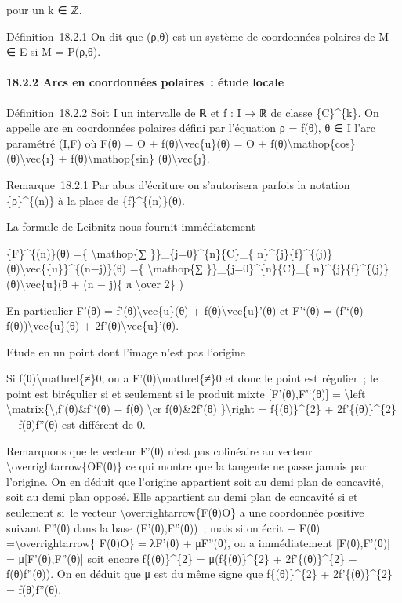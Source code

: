 \documentclass[]{article}
\begin{document}
pour un k ∈ ℤ.

Définition~18.2.1 On dit que (ρ,θ) est un système de coordonnées
polaires de M ∈ E si M = P(ρ,θ).

\paragraph{18.2.2 Arcs en coordonnées polaires~: étude locale}

Définition~18.2.2 Soit I un intervalle de ℝ et f : I → ℝ de classe
\{C\}\^{}\{k\}. On appelle arc en coordonnées polaires défini par
l'équation ρ = f(θ), θ ∈ I l'arc paramétré (I,F) où F(θ) = O +
f(θ)\textbackslash{}vec\{u\}(θ) = O + f(θ)\textbackslash{}mathop\{cos\}
(θ)\textbackslash{}vec\{ı\} + f(θ)\textbackslash{}mathop\{sin\}
(θ)\textbackslash{}vec\{ȷ\}.

Remarque~18.2.1 Par abus d'écriture on s'autorisera parfois la notation
\{ρ\}\^{}\{(n)\} à la place de \{f\}\^{}\{(n)\}(θ).

La formule de Leibnitz nous fournit immédiatement

\{F\}\^{}\{(n)\}(θ) =\{ \textbackslash{}mathop\{∑
\}\}\_\{j=0\}\^{}\{n\}\{C\}\_\{
n\}\^{}\{j\}\{f\}\^{}\{(j)\}(θ)\textbackslash{}vec\{\{u\}\}\^{}\{(n−j)\}(θ)
=\{ \textbackslash{}mathop\{∑ \}\}\_\{j=0\}\^{}\{n\}\{C\}\_\{
n\}\^{}\{j\}\{f\}\^{}\{(j)\}(θ)\textbackslash{}vec\{u\}(θ + (n − j)\{ π
\textbackslash{}over 2\} )

En particulier F'(θ) = f'(θ)\textbackslash{}vec\{u\}(θ) +
f(θ)\textbackslash{}vec\{u\}'(θ) et F'`(θ) = (f'`(θ) −
f(θ))\textbackslash{}vec\{u\}(θ) + 2f'(θ)\textbackslash{}vec\{u\}'(θ).

Etude en un point dont l'image n'est pas l'origine

Si f(θ)\textbackslash{}mathrel\{≠\}0, on a
F'(θ)\textbackslash{}mathrel\{≠\}0 et donc le point est régulier~; le
point est birégulier si et seulement si le produit mixte
{[}F'(θ),F'`(θ){]} = \textbackslash{}left
\textbar{}\textbackslash{}matrix\{\textbackslash{},f'(θ)\&f'`(θ) − f(θ)
\textbackslash{}cr f(θ)\&2f'(θ) \}\textbackslash{}right \textbar{} =
f\{(θ)\}\^{}\{2\} + 2f'\{(θ)\}\^{}\{2\} − f(θ)f''(θ) est différent de 0.

Remarquons que le vecteur F'(θ) n'est pas colinéaire au vecteur
\textbackslash{}overrightarrow\{OF(θ)\} ce qui montre que la tangente ne
passe jamais par l'origine. On en déduit que l'origine appartient soit
au demi plan de concavité, soit au demi plan opposé. Elle appartient au
demi plan de concavité si et seulement si~le vecteur
\textbackslash{}overrightarrow\{F(θ)O\} a une coordonnée positive
suivant F''(θ) dans la base (F'(θ),F''(θ))~; mais si on écrit − F(θ)
=\textbackslash{}overrightarrow\{ F(θ)O\} = λF'(θ) + μF''(θ), on a
immédiatement {[}F(θ),F'(θ){]} = μ{[}F'(θ),F''(θ){]} soit encore
f\{(θ)\}\^{}\{2\} = μ(f\{(θ)\}\^{}\{2\} + 2f'\{(θ)\}\^{}\{2\} −
f(θ)f''(θ)). On en déduit que μ est du même signe que f\{(θ)\}\^{}\{2\}
+ 2f'\{(θ)\}\^{}\{2\} − f(θ)f''(θ).
\end{document}
